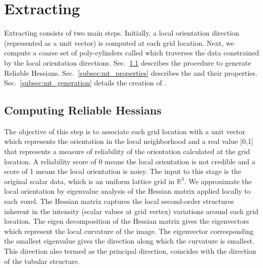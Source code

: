 \section{Extracting \mt}\label{sec:ext_mt}
Extracting \mt consists of two main steps. Initially, a local orientation direction (represented as a unit vector) is computed at each grid location.
Next, we compute a coarse set of poly-cylinders called \mt which traverses the data constrained by the local orientation directions. Sec.~\ref{subsec:reliable_hessian} describes the procedure to generate Reliable Hessians. Sec.~\ref{subsec:mt_properties}  describes the \mt and their properties. Sec.~\ref{subsec:mt_generation} details the creation of \mt.
\subsection{Computing Reliable Hessians}\label{subsec:reliable_hessian} 
The objective of this step is to associate each grid location with a unit vector which represents the orientation in the local neighborhood and a real value [0,1] that represents a measure of reliability of the orientation calculated at the grid location. A reliability score of 0 means the local orientation is not credible and a score of 1 means the local orientation is noisy.
The input to this stage is the original scalar data, which is an uniform lattice grid in $\mathbb{R}^3$. We approximate the local orientation  by eigenvalue analysis of the Hessian matrix applied locally to each voxel.
The Hessian matrix captures the local second-order structures inherent in the intensity (scalar values at grid vertex) variations around each grid location.
The eigen decomposition of the Hessian matrix gives the eigenvectors which represent the local curvature of the image. The eigenvector corresponding the smallest eigenvalue gives the direction along which the curvature is smallest. This direction also termed as the principal direction, coincides with the direction of the tubular structure. 


